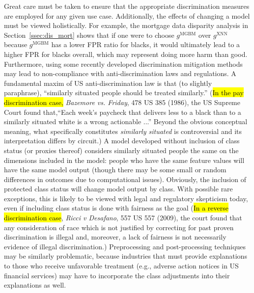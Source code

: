 \documentclass[information,article,accept,moreauthors,pdftex]{Definitions/mdpi}
\begin{document}
{Great care must be taken to ensure that the appropriate discrimination measures are employed for any given use case. Additionally, the effects of changing a model must be viewed holistically.  For example, the mortgage data disparity analysis in Section~\ref{ssec:dis_mort} shows that if one were to choose $g^\text{MGBM}$ over $g^\text{XNN}$ because $g^\text{MGBM}$ has a lower FPR ratio for blacks, it would ultimately lead to a higher FPR for blacks overall, which may represent doing more harm than good. Furthermore, using some recently developed discrimination mitigation methods may lead to non-compliance with anti-discrimination laws and regulations.  A fundamental maxim of US anti-discrimination law is that (to slightly paraphrase), ``similarly situated people should be treated similarly.'' ({\hl{In the pay discrimination case,} \textit{Bazemore vs. Friday}, 478 US 385 (1986), the US Supreme Court found that,``Each week's paycheck that delivers less to a black than to a similarly situated white is a wrong actionable ...''  Beyond the obvious conceptual meaning, what specifically constitutes \textit{similarly situated} is controversial and its interpretation differs by circuit.}) %
A model developed without inclusion of class status (or proxies thereof) considers similarly situated people the same on the dimensions included in the model: people who have the same feature values will have the same model output (though there may be some small or random differences in outcomes due to computational issues). Obviously, the inclusion of protected class status will change model output by class. With possible rare exceptions, this is likely to be viewed with legal and regulatory skepticism today, even if including class status is done with fairness as the goal ({\hl{In a reverse discrimination case}, \textit{Ricci v Desafano}, 557 US 557 (2009), the court found that any consideration of race which is not justified by correcting for past proven discrimination is illegal and, moreover, a lack of fairness is not necessarily evidence of illegal discrimination.}) Preprocessing and post-processing techniques may be similarly problematic, because industries that must provide explanations to those who receive unfavorable treatment (e.g., adverse action notices in US financial services) may have to incorporate the class adjustments into their explanations as well.


}
\end{document}
